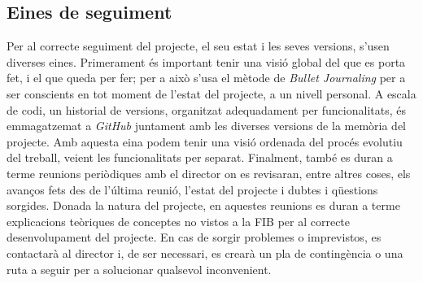 \documentclass[a4paper]{report}
\begin{document}
	\subsection{Eines de seguiment}
	Per al correcte seguiment del projecte, el seu estat i les seves versions, s'usen diverses eines. Primerament és important tenir una visió global del que es porta fet, i el que queda per fer; per a això s'usa el mètode de \textit{Bullet Journaling} per a ser conscients en tot moment de l'estat del projecte, a un nivell personal. \newline
	A escala de codi, un historial de versions, organitzat adequadament per funcionalitats, és emmagatzemat a \textit{GitHub} juntament amb les diverses versions de la memòria del projecte. Amb aquesta eina podem tenir una visió ordenada del procés evolutiu del treball, veient les funcionalitats per separat.\newline
	Finalment, també es duran a terme reunions periòdiques amb el director on es revisaran, entre altres coses, els avanços fets des de l'última reunió, l'estat del projecte i dubtes i qüestions sorgides. Donada la natura del projecte, en aquestes reunions es duran a terme explicacions teòriques de conceptes no vistos a la FIB per al correcte desenvolupament del projecte.
	\newline
	En cas de sorgir problemes o imprevistos, es contactarà al director i, de ser necessari, es crearà un pla de contingència o una ruta a seguir per a solucionar qualsevol inconvenient.
	 
	
	
	
	\newpage
	
	\renewcommand{\bibname}{Referencies}
	
	 
	
	
\end{document}
